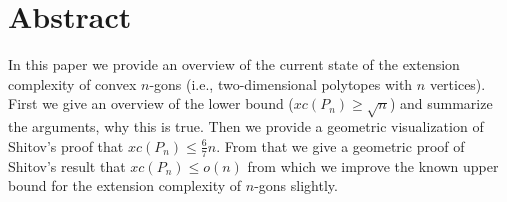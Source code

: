 \section*{Abstract}
In this paper we provide an overview of the current state of the extension complexity of convex $n$-gons (i.e., two-dimensional polytopes with $n$ vertices). First we give an overview of the lower bound ($xc(P_n) \geq \sqrt{n}$) and summarize the arguments, why this is true. Then we provide a geometric visualization of Shitov's proof that $xc(P_n) \leq \frac{6}{7}n$. From that we give a geometric proof of Shitov's result that $xc(P_n) \leq o(n)$ from which we improve the known upper bound for the extension complexity of $n$-gons slightly.
